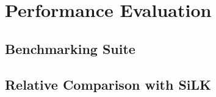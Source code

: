 \chapter{Performance Evaluation}\label{ch:performance-evaluation}

\section{Benchmarking Suite}\label{sec:benchmarking-suite}
\section{Relative Comparison with SiLK}\label{sec:silk-relative-comparison}
